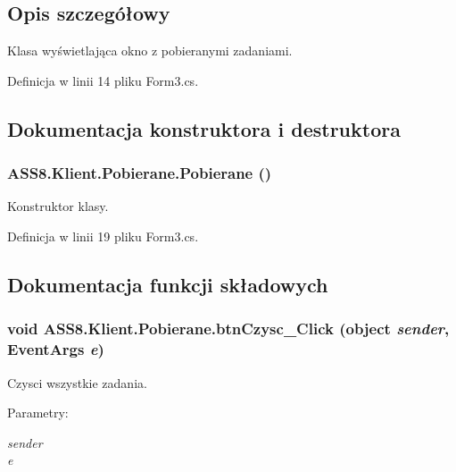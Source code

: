 \subsection{Opis szczegółowy}
Klasa wyświetlająca okno z pobieranymi zadaniami. 



Definicja w linii 14 pliku Form3.cs.

\subsection{Dokumentacja konstruktora i destruktora}
\hypertarget{a00019_60f6f87bc8f96efae8cb13c9b2da15bd}{
\subsubsection[{Pobierane}]{\setlength{\rightskip}{0pt plus 5cm}ASS8.Klient.Pobierane.Pobierane ()}}
\label{dd/da2/a00019_60f6f87bc8f96efae8cb13c9b2da15bd}


Konstruktor klasy. 



Definicja w linii 19 pliku Form3.cs.

\subsection{Dokumentacja funkcji składowych}
\hypertarget{a00019_ce1fb8ae1d066f42b327a30a1079765b}{
\subsubsection[{btnCzysc\_\-Click}]{\setlength{\rightskip}{0pt plus 5cm}void ASS8.Klient.Pobierane.btnCzysc\_\-Click (object {\em sender}, \/  EventArgs {\em e})}}
\label{dd/da2/a00019_ce1fb8ae1d066f42b327a30a1079765b}


Czysci wszystkie zadania. 

\begin{Desc}
\item[Parametry:]
\begin{description}
\item[{\em sender}]\item[{\em e}]\end{description}
\end{Desc}


